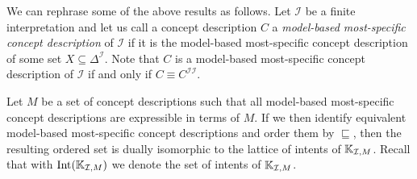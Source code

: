 We can rephrase some of the above results as follows.  Let $\mathcal{I}$ be a finite
interpretation and let us call a concept description $C$ a \emph{model-based most-specific
  concept description} of $\mathcal{I}$ if it is the model-based most-specific concept
description of some set $X \subseteq \Delta^{\mathcal{I}}$.  Note that $C$ is a
model-based most-specific concept description of $\mathcal{I}$ if and only if $C \equiv
C^{\mathcal{I}\mathcal{I}}$.

Let $M$ be a set of concept descriptions such that all model-based most-specific concept
descriptions are expressible in terms of $M$.  If we then identify equivalent model-based
most-specific concept descriptions and order them by $\sqsubseteq$, then the resulting
ordered set is dually isomorphic to the lattice of intents of ${\mathbb{K}}_{\mathcal{I}, M}$.
Recall that with $\operatorname{Int}({\mathbb{K}}_{\mathcal{I}, M})$ we denote the set of intents of ${\mathbb{K}}_{\mathcal{I}, M}$.

